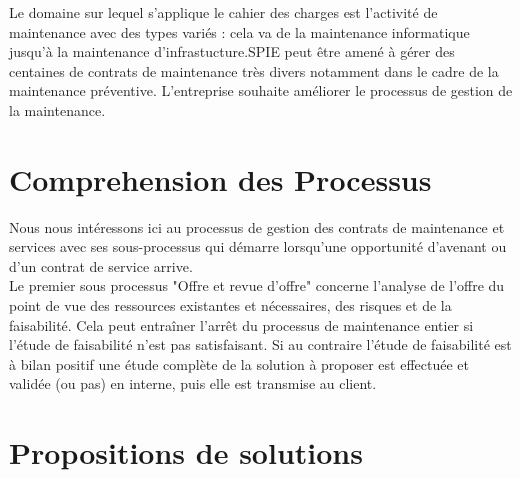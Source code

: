 \documentclass[]{scrartcl}
\begin{document}
Le domaine sur lequel s'applique le cahier des charges est l'activité de maintenance avec des types variés : cela va de la maintenance informatique jusqu'à la maintenance d'infrastucture.SPIE peut être amené à gérer des centaines de contrats de maintenance très divers notamment dans le cadre de la maintenance préventive. L'entreprise souhaite améliorer le processus de gestion de la maintenance.  


\section{Comprehension des Processus}
Nous nous intéressons ici au processus de gestion des contrats de maintenance et services avec ses sous-processus qui démarre lorsqu'une opportunité d'avenant ou d'un contrat de service arrive.\\

Le premier sous processus "Offre et revue d'offre" concerne l'analyse de l'offre du point de vue des ressources existantes et nécessaires, des risques et de la faisabilité. Cela peut entraîner l'arrêt du processus de maintenance entier si l'étude de faisabilité n'est pas satisfaisant. Si au contraire l'étude de faisabilité est à bilan positif une étude complète de la solution à proposer est effectuée et validée (ou pas) en interne, puis elle est transmise au client.




\section{Propositions de solutions}
\end{document}
